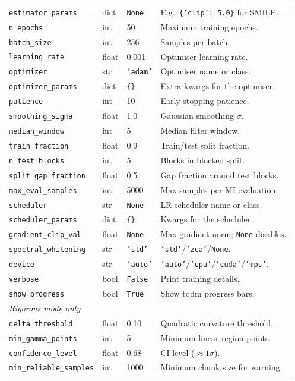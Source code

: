 \documentclass[12pt]{article}
\newcommand{\api}[1]{\texttt{#1}}
\begin{document}
\begin{center}
\begin{tabular}{lllp{6.5cm}}
\api{estimator\_params} & dict & \api{None} & E.g.\ \api{\{'clip': 5.0\}} for SMILE. \\
\api{n\_epochs} & int & 50 & Maximum training epochs. \\
\api{batch\_size} & int & 256 & Samples per batch. \\
\api{learning\_rate} & float & 0.001 & Optimiser learning rate. \\
\api{optimizer} & str & \api{'adam'} & Optimiser name or class. \\
\api{optimizer\_params} & dict & \api{\{\}} & Extra kwargs for the optimiser. \\
\api{patience} & int & 10 & Early-stopping patience. \\
\api{smoothing\_sigma} & float & 1.0 & Gaussian smoothing $\sigma$. \\
\api{median\_window} & int & 5 & Median filter window. \\
\api{train\_fraction} & float & 0.9 & Train/test split fraction. \\
\api{n\_test\_blocks} & int & 5 & Blocks in blocked split. \\
\api{split\_gap\_fraction} & float & 0.5 & Gap fraction around test blocks. \\
\api{max\_eval\_samples} & int & 5000 & Max samples per MI evaluation. \\
\api{scheduler} & str & \api{None} & LR scheduler name or class. \\
\api{scheduler\_params} & dict & \api{\{\}} & Kwargs for the scheduler. \\
\api{gradient\_clip\_val} & float & \api{None} & Max gradient norm; \api{None} disables. \\
\api{spectral\_whitening} & str & \api{'std'} & \api{'std'}/\api{'zca'}/\api{None}. \\
\api{device} & str & \api{'auto'} & \api{'auto'}/\api{'cpu'}/\api{'cuda'}/\api{'mps'}. \\
\api{verbose} & bool & \api{False} & Print training details. \\
\api{show\_progress} & bool & \api{True} & Show tqdm progress bars. \\
\midrule
\multicolumn{4}{l}{\textit{Rigorous mode only}} \\
\api{delta\_threshold} & float & 0.10 & Quadratic curvature threshold. \\
\api{min\_gamma\_points} & int & 5 & Minimum linear-region points. \\
\api{confidence\_level} & float & 0.68 & CI level ($\approx 1\sigma$). \\
\api{min\_reliable\_samples} & int & 1000 & Minimum chunk size for warning. \\
\bottomrule
\end{tabular}
\end{center}
\end{document}
